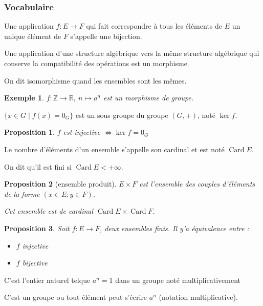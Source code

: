 \documentclass[french]{beamer}
\newtheorem{proposition}{Proposition}
\newtheorem{exemple}{Exemple}
\newcommand{\R}{\mathbb{R}}
\newcommand{\Z}{\mathbb{Z}}
\begin{document}
\begin{frame}[allowframebreaks]
  \frametitle{Vocabulaire}
  \begin{definition}[bijection]
    Une application $f:E\to F$ qui fait correspondre à tous les éléments
    de $E$ un unique élément de $F$ s'appelle une bijection.
  \end{definition}
  \begin{definition}[morphisme]
    Une application d'une structure algèbrique vers la même structure
    algébrique qui conserve la compatibilité des opérations est un
    morphisme.

    On dit isomorphisme quand les ensembles sont les mêmes.
  \end{definition}
  \begin{exemple}
    $f:\Z\to\R,\ n\mapsto a^n$ est un morphisme de groupe.
  \end{exemple}
  \framebreak
  \begin{definition}[noyau]
    $\lbrace x\in G \mid f(x) = 0_G \rbrace$ est un sous groupe du
    groupe $(G,+)$, noté $\ker f$.
  \end{definition}
  \begin{proposition}
    $f$ est injective $\iff \ker f = {0_G}$
  \end{proposition}
  \begin{definition}[cardinal]
    Le nombre d'éléments d'un ensemble s'appelle son cardinal et est
    noté $\mathop{Card} E$.

    On dit qu'il est fini si $\mathop{Card} E < +\infty$.
  \end{definition}
  \begin{proposition}[ensemble produit]
    $E\times F$ est l'ensemble des couples d'éléments de la forme $(x\in
    E; y\in F)$.

    Cet ensemble est de cardinal $\mathop{Card} E \times \mathop{Card}
    F$.
  \end{proposition}
  \framebreak
  \begin{proposition}
    Soit $f:E\to F$, deux ensembles finis. Il y'a équivalence entre :
    \begin{itemize}
      \item $f$ injective
      \item $f$ bijective
    \end{itemize}
  \end{proposition}
  \begin{definition}
    C'est l'entier naturel telque $a^n = 1$ dans un groupe noté
    multiplicativement
  \end{definition}
  \begin{definition}
    C'est un groupe ou tout élément peut s'écrire $a^n$ (notation
    multiplicative).
  \end{definition}
\end{frame}
\end{document}
